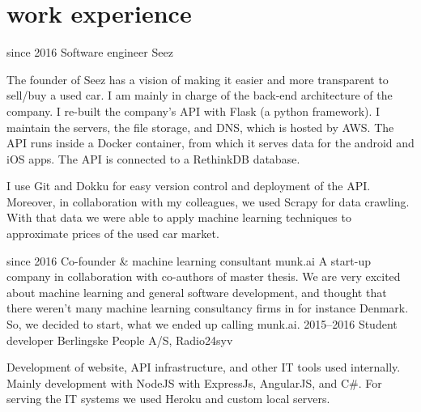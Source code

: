 \documentclass[]{friggeri-cv}
\begin{document}
\section{work experience}

\begin{entrylist}
  \entry
    {since 2016}
    {Software engineer}
    {Seez}
    {
      The founder of Seez has a vision of making it easier and more transparent to sell/buy a used car.
      I am mainly in charge of the back-end architecture of the company.
      I re-built the company's API with Flask (a python framework).
      I maintain the servers, the file storage, and DNS, which is hosted by AWS. 
      The API runs inside a Docker container, from which it serves data for the android and iOS apps.
      The API is connected to a RethinkDB database.

      I use Git and Dokku for easy version control and deployment of the API.
      Moreover, in collaboration with my colleagues, we used Scrapy for data crawling.
      With that data we were able to apply machine learning techniques to approximate prices of the used car market.
	  }
  \entry
    {since 2016}
    {Co-founder \& machine learning consultant}
    {munk.ai}
    {
      A start-up company in collaboration with co-authors of master thesis.
      We are very excited about machine learning and general software development, and thought that there weren't many machine learning consultancy firms in for instance Denmark.
      So, we decided to start, what we ended up calling munk.ai.
    }
  \entry
    {2015--2016}
    {Student developer}
    {Berlingske People A/S, Radio24syv}
    {
      Development of website, API infrastructure, and other IT tools used internally. 
      Mainly development with NodeJS with ExpressJs, AngularJS, and C\#.
      For serving the IT systems we used Heroku and custom local servers.

}
\end{entrylist}
\end{document}

